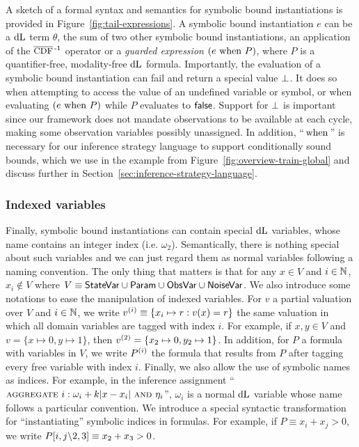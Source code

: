 \documentclass[acmsmall,screen,nonacm]{acmart}
\begin{document}
A sketch of a formal syntax and semantics for symbolic bound instantiations is provided in Figure~\ref{fig:tail-expressions}. A symbolic bound instantiation $e$ can be a $\mathop{}\!\mathrm{d} \text{L}$ term $\theta$, the sum of two other symbolic bound instantiations, an application of the $\InvCCDF$ operator or a \emph{guarded expression} $(e \operatorname{\,\text{when}\,} P)$, where $P$ is a quantifier-free, modality-free $\mathop{}\!\mathrm{d} \text{L}$ formula. Importantly, the evaluation of a symbolic bound instantiation can fail and return a special value $\bot$. It does so when attempting to access the value of an undefined variable or symbol, or when evaluating $(e \operatorname{\,\text{when}\,} P)$ while $P$ evaluates to $\mathsf{false}$. Support for $\bot$ is important since our framework does not mandate observations to be available at each cycle, making some observation variables possibly unassigned. In addition, ``$\operatorname{\,\text{when}\,}$'' is necessary for our inference strategy language to support conditionally sound bounds, which we use in the example from Figure~\ref{fig:overview-train-global} and discuss further in Section~\ref{sec:inference-strategy-language}.

\subsubsection{Indexed variables}

Finally, symbolic bound instantiations can contain special $\mathop{}\!\mathrm{d} \text{L}$ variables, whose name contains an integer index (i.e. $\omega_2$). Semantically, there is nothing special about such variables and we can just regard them as normal variables following a naming convention. The only thing that matters is that for any $x \in V$ and $i \in \mathbb{N}$, $x_i \notin V$ where $V \equiv \mathsf{StateVar} \cup \mathsf{Param} \cup \mathsf{ObsVar} \cup \mathsf{NoiseVar}$. We also introduce some notations to ease the manipulation of indexed variables. For $v$ a partial valuation over $V$ and $i \in \mathbb{N}$, we write ${v}^{(i)} \equiv \{x_i \mapsto r : v(x) = r \}$ the same valuation in which all domain variables are tagged with index $i$. For example, if $x, y \in V$ and $v = \{x \mapsto 0, y \mapsto 1\}$, then ${v}^{(2)} = \{x_2 \mapsto 0, y_2 \mapsto 1\}$. In addition, for $P$ a formula with variables in $V$, we write ${P}^{(i)}$ the formula that results from $P$ after tagging every free variable with index $i$. Finally, we also allow the use of symbolic names as indices. For example, in the inference assignment ``$\operatorname{\textsc{aggregate}\,} i: \omega_i + k|x - x_i| \operatorname*{\,\textsc{and}\,} \eta_i$'', $\omega_i$ is a normal $\mathop{}\!\mathrm{d} \text{L}$ variable whose name follows a particular convention. We introduce a special syntactic transformation for ``instantiating'' symbolic indices in formulas. For example, if $P \equiv x_i + x_j > 0$, we write ${P}[i,j \backslash 2,3] \equiv x_2 + x_3 > 0$.
\end{document}
